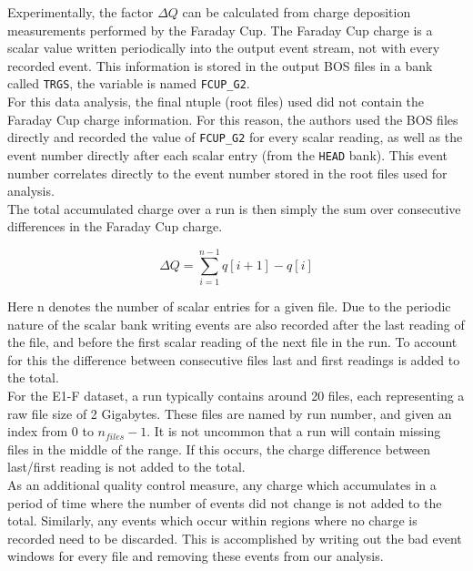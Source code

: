 Experimentally, the factor $\Delta Q$ can be calculated from charge deposition measurements performed by the Faraday Cup.  The Faraday Cup charge is a scalar value written periodically into the output event stream, not with every recorded event.  This information is stored in the output BOS files in a bank called \texttt{TRGS}, the variable is named \texttt{FCUP\_G2}.  \\

For this data analysis, the final ntuple (root files) used did not contain the Faraday Cup charge information.  For this reason, the authors used the BOS files directly and recorded the value of \texttt{FCUP\_G2} for every scalar reading, as well as the event number directly after each scalar entry (from the \texttt{HEAD} bank).  This event number correlates directly to the event number stored in the root files used for analysis. \\

The total accumulated charge over a run is then simply the sum over consecutive differences in the Faraday Cup charge.

\begin{equation}
	\Delta Q = \sum_{i=1}^{n-1} q[i+1]-q[i] 	
\end{equation}

Here n denotes the number of scalar entries for a given file.  Due to the periodic nature of the scalar bank writing events are also recorded after the last reading of the file, and before the first scalar reading of the next file in the run.  To account for this the difference between consecutive files last and first readings is added to the total. \\

For the E1-F dataset, a run typically contains around 20 files, each representing a raw file size of 2 Gigabytes.  These files are named by run number, and given an index from $0$ to $n_{files}-1$.  It is not uncommon that a run will contain missing files in the middle of the range.  If this occurs, the charge difference between last/first reading is not added to the total. \\

As an additional quality control measure, any charge which accumulates in a period of time where the number of events did not change is not added to the total.  Similarly, any events which occur within regions where no charge is recorded need to be discarded.  This is accomplished by writing out the bad event windows for every file and removing these events from our analysis. \\

